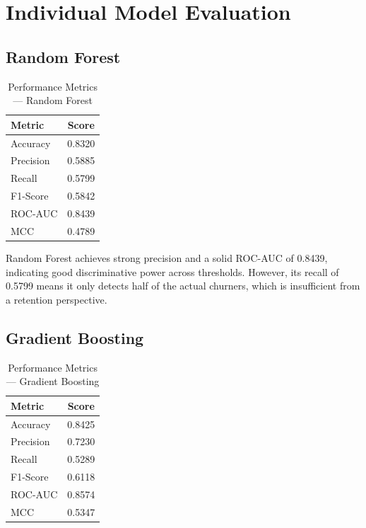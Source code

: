 \section{Individual Model Evaluation}

\subsection{Random Forest}

\begin{table}[H]
    \centering
    \caption{Performance Metrics — Random Forest}
    \label{tab:rf_metrics}
    \vspace{3mm}
    \begin{tabular}{|l|c|}
        \hline
        \textbf{Metric} & \textbf{Score} \\
        \hline
        Accuracy   & 0.8320 \\
        \hline
        Precision  & 0.5885 \\
        \hline
        Recall     & 0.5799 \\
        \hline
        F1-Score   & 0.5842 \\
        \hline
        ROC-AUC    & 0.8439 \\
        \hline
        MCC        & 0.4789 \\
        \hline
    \end{tabular}
\end{table}

Random Forest achieves strong precision and a solid ROC-AUC of 0.8439, indicating good discriminative power across thresholds. However, its recall of 0.5799 means it only detects half of the actual churners, which is insufficient from a retention perspective.

\subsection{Gradient Boosting}

\begin{table}[H]
    \centering
    \caption{Performance Metrics — Gradient Boosting}
    \label{tab:gbm_metrics}
    \vspace{3mm}
    \begin{tabular}{|l|c|}
        \hline
        \textbf{Metric} & \textbf{Score} \\
        \hline
        Accuracy   & 0.8425 \\
        \hline
        Precision  & 0.7230 \\
        \hline
        Recall     & 0.5289 \\
        \hline
        F1-Score   & 0.6118 \\
        \hline
        ROC-AUC    & 0.8574 \\
        \hline
        MCC        & 0.5347 \\
        \hline
    \end{tabular}
\end{table}


